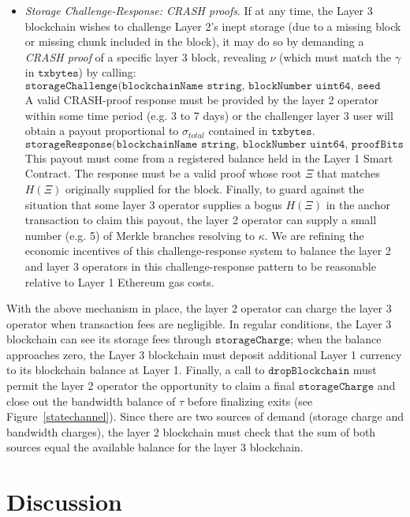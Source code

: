 \documentclass{article}
\newcommand{\keyroot}{\kappa}
\newcommand{\hash}[1]{H(#1)}
\newcommand{\seedhash}{\gamma}
\newcommand{\seed}{\nu}
\begin{document}
\begin{itemize}
    \item {\em Storage Challenge-Response: CRASH proofs}. If at any time, the Layer 3 blockchain wishes to challenge Layer 2's inept storage (due to a missing block or missing chunk included in the block), it may do so by demanding a {\em CRASH proof} of a specific layer 3 block, revealing $\seed$ (which must match the $\seedhash$ in $\texttt{txbytes}$) by calling:
    \[ 
    \texttt{storageChallenge(blockchainName string, blockNumber uint64, seed bytes32)}
    \] 
    A valid CRASH-proof response must be provided by the layer 2 operator within some time period (e.g. 3 to 7 days) or the challenger layer 3 user will obtain a payout proportional to $\sigma_{total}$ contained in $\texttt{txbytes}$. 
    \[ 
    \texttt{storageResponse(blockchainName string, blockNumber uint64, proofBits uint64, proofBytes bytes)}
    \] 
    This payout must come from a registered balance held in the Layer 1 Smart Contract.  The response must be a valid proof whose root $\Xi$ that matches $\hash{\Xi}$ originally supplied for the block.  Finally, to guard against the situation that some layer 3 operator supplies a bogus $\hash{\Xi}$ in the anchor transaction to claim this payout, the layer 2 operator can supply a small number (e.g. 5) of Merkle branches resolving to $\keyroot$.  We are refining the economic incentives of this challenge-response system to balance the layer 2 and layer 3 operators in this challenge-response pattern to be reasonable relative to Layer 1 Ethereum gas costs.
\end{itemize}
With the above mechanism in place, the layer 2 operator can charge the layer 3 operator when transaction fees are negligible.  In regular conditions, the Layer 3 blockchain  can see its storage fees through $\texttt{storageCharge}$; when the balance approaches zero, the Layer 3 blockchain must deposit additional Layer 1 currency to its blockchain balance at Layer 1.  Finally, a call to $\texttt{dropBlockchain}$ must permit the layer 2 operator the opportunity to claim a final $\texttt{storageCharge}$ and close out the bandwidth balance of $\tau$ before  finalizing exits (see Figure~\ref{statechannel}).  Since there are two sources of demand (storage charge and bandwidth charges), the layer 2 blockchain must check that the sum of both sources equal the available balance for the layer 3 blockchain.

\section{Discussion}
\end{document}

